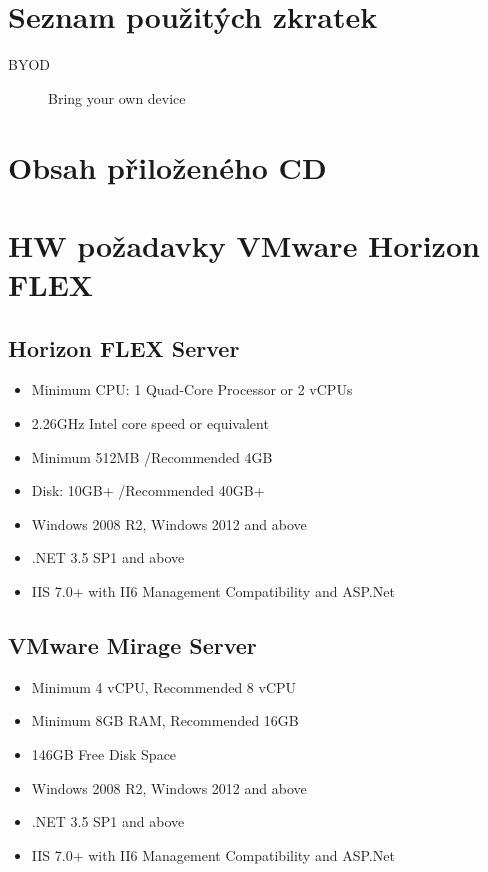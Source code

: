 \chapter{Seznam použitých zkratek}
\begin{description}
	\item[BYOD] Bring your own device
\end{description}




\chapter{Obsah přiloženého CD}
 
 
\chapter{HW požadavky VMware Horizon FLEX}\label{pozadavky}

\section{Horizon FLEX Server}
\begin{itemize}
\item Minimum CPU: 1 Quad-Core Processor or 2 vCPUs
\item 2.26GHz Intel core speed or equivalent
\item Minimum 512MB /Recommended 4GB
\item Disk: 10GB+ /Recommended 40GB+
\item Windows 2008 R2, Windows 2012 and above
\item .NET 3.5 SP1 and above
\item IIS 7.0+ with II6 Management Compatibility and ASP.Net
\end{itemize}

\section{VMware Mirage Server}
\begin{itemize}
\item  Minimum 4 vCPU, Recommended 8 vCPU
\item Minimum 8GB RAM, Recommended 16GB
\item  146GB Free Disk Space
\item Windows 2008 R2, Windows 2012 and above
\item .NET 3.5 SP1 and above
\item IIS 7.0+ with II6 Management Compatibility and ASP.Net 
\end{itemize}